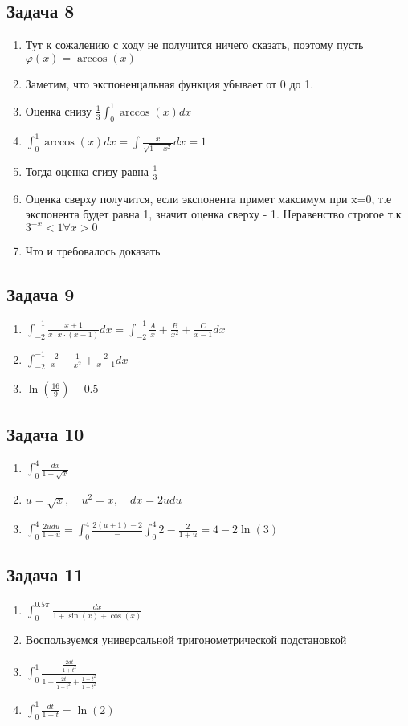 \documentclass[a4paper,12pt]{article}
\begin{document}
\subsection{Задача 8}
\begin{enumerate}
    \item Тут к сожалению с ходу не получится ничего сказать, поэтому пусть $\varphi (x) = \arccos(x)$
    \item Заметим, что экспоненцальная функция убывает от 0 до 1.
    \item Оценка снизу $\frac{1}{3}\int_{0}^{1}\arccos(x)dx$
    \item $\int_{0}^{1} \arccos(x)dx = \int \frac{x}{\sqrt{1-x^2}}dx = 1$
    \item Тогда оценка сгизу равна $\frac{1}{3}$
    \item Оценка сверху получится, если экспонента примет максимум при x=0, т.е экспонента будет равна 1, значит оценка сверху - 1. Неравенство строгое т.к $3^{-x}<1 \forall x > 0$
    \item Что и требовалось доказать
\end{enumerate}

\subsection{Задача 9}
\begin{enumerate}
    \item $\int_{-2}^{-1}\frac{x+1}{x\cdot x\cdot (x-1)}dx = \int_{-2}^{-1} \frac{A}{x} + \frac{B}{x^2} + \frac{C}{x-1} dx$
    \item $\int_{-2}^{-1}\frac{-2}{x}-\frac{1}{x^2}+\frac{2}{x-1}dx$
    \item $\ln(\frac{16}{9})-0.5$
\end{enumerate}

\subsection{Задача 10}
\begin{enumerate}
    \item $\int_{0}^{4}\frac{dx}{1+\sqrt{x}}$
    \item $u = \sqrt{x}, \quad u^2 = x, \quad dx = 2udu$
    \item $\int_{0}^{4} \frac{2udu}{1+u} = \int_{0}^{4} \frac{2(u+1)-2} = \int_{0}^{4} 2-\frac{2}{1+u} = 4-2\ln(3)$
\end{enumerate}

\subsection{Задача 11}
\begin{enumerate}
    \item $\int_{0}^{0.5\pi} \frac{dx}{1+\sin(x)+\cos(x)}$
    \item Воспользуемся универсальной тригонометрической подстановкой
    \item $\int_{0}^{1} \frac{\frac{2dt}{1+t^2}}{1+\frac{2t}{1+t^2}+\frac{1-t^2}{1+t^2}}$
    \item $\int_{0}^{1} \frac{dt}{1+t} = \ln(2)$
\end{enumerate}
\end{document}

